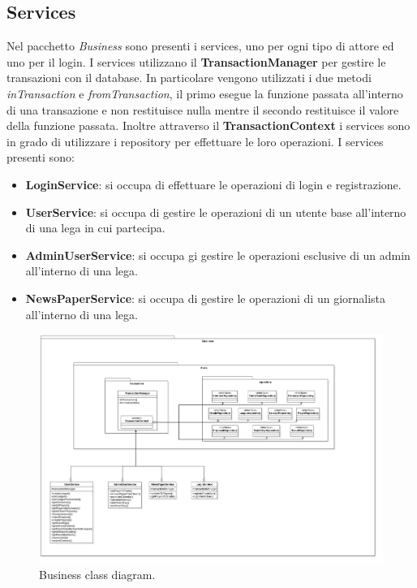 \subsection{Services}
Nel pacchetto \textit{Business} sono presenti i services, uno per ogni tipo di attore ed uno per il login.
I services utilizzano il \textbf{TransactionManager} per gestire le transazioni con il database.
In particolare vengono utilizzati i due metodi \textit{inTransaction} e \textit{fromTransaction}, il primo esegue la funzione
 passata all'interno di una transazione e non restituisce nulla mentre il secondo restituisce
 il valore della funzione passata. Inoltre attraverso il \textbf{TransactionContext} i services
 sono in grado di utilizzare i repository per effettuare le loro operazioni.
 I services presenti sono:
 \begin{itemize}
    \item \textbf{LoginService}: si occupa di effettuare le operazioni di login e registrazione.
    \item \textbf{UserService}: si occupa di gestire le operazioni di un utente base all'interno di una lega in cui partecipa.
    \item \textbf{AdminUserService}: si occupa gi gestire le operazioni esclusive di un admin all'interno di una lega.
    \item \textbf{NewsPaperService}: si occupa di gestire le operazioni di un giornalista all'interno di una lega.
 \end{itemize}

\begin{figure}
    \centering
    \includegraphics[width=\textwidth]{Resources/graficiUML/BusinessClassDiagram.png}        
    \caption{Business class diagram.}
    \label{fig:business_class_diagram}
\end{figure}

